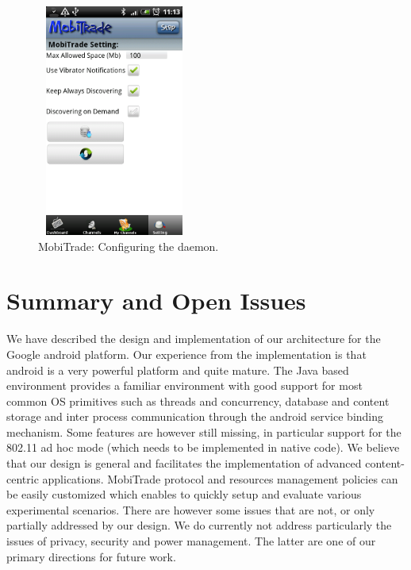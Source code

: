 \begin{figure}[!h]
\begin{center}
\includegraphics[width=2in,height=3in]{Chapitre6/Config.png}
\end{center}
\caption{MobiTrade: Configuring the daemon.}
\label{Config}
\end{figure}

\section{Summary and Open Issues}
\label{MobiTradeSoftSummary}

We have described the design and implementation of our architecture for the Google android platform. Our experience from the implementation is that android is a very powerful platform and quite mature. The Java based environment provides a familiar environment with good support for most common OS primitives such as threads and concurrency, database and content storage and inter process communication through the android service binding mechanism. Some features are however still missing, in particular support for the 802.11 ad hoc mode (which needs to be implemented in native code). We believe that our design is general and facilitates the implementation of advanced content-centric applications. MobiTrade protocol and resources management policies can be easily customized which enables to quickly setup and evaluate various experimental scenarios. There are however some issues that are not, or only partially addressed by our design. We do currently not address particularly the issues of privacy, security and power management. The latter are one of our primary directions for future work. 

